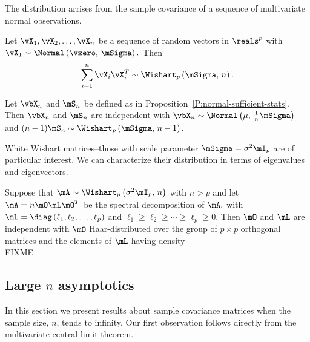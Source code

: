 \noindent
The distribution arrises from the sample covariance of a sequence of
multivariate normal observations.

\begin{proposition}
Let
\(
    \vX_1, \vX_2, \ldots, \vX_n
\)
be a sequence of \iid random vectors in 
\(
    \reals^p
\)
with
\(
    \vX_1
    \sim
    \Normal \left(
        \vzero, \,
        \mSigma
    \right).
\)
Then
\[
    \sum_{i=1}^n
        \vX_i \vX_i^T
    \sim
    \Wishart_p \left(
        \mSigma, \,
        n
    \right).
\]
\end{proposition}

\begin{proposition}
Let 
\(
    \vbX_n
\) 
and 
\(
    \mS_n
\)
be defined as in Proposition~\ref{P:normal-sufficient-stats}.  Then
\(
    \vbX_n
\)
and
\(
    \mS_n
\)
are independent with
\(
    \vbX_n
    \sim
    \Normal \left(
        \mu, \,
        \frac{1}{n}
        \mSigma
    \right)
\)
and
\(
    (n-1)
    \mS_n
    \sim
    \Wishart_p \left(
        \mSigma, \,
        n-1
    \right)
\).
\end{proposition}

\noindent
White Wishart matrices--those with scale parameter $\mSigma = \sigma^2 \mI_p$
are of particular interest.  We can characterize their distribution in
terms of eigenvalues and eigenvectors.

\begin{proposition}
Suppose that
\(
    \mA
    \sim
    \Wishart_p \left(
        \sigma^2 \mI_p, \,
        n
    \right)
\)
with
\(
    n > p
\)
and let
\(
    \mA = n \mO \mL \mO^T
\)
be the spectral decomposition of
\(
    \mA,
\)
with
\(
    \mL
    =
    \diag \left(
        \ell_1,
        \ell_2,
        \ldots,
        \ell_p
    \right)
\)
and
\(
    \ell_1
    \geq
    \ell_2
    \geq
    \cdots
    \geq
    \ell_p
    \geq
    0.
\)
Then $\mO$ and $\mL$ are independent with $\mO$ Haar-distributed over
the group of $p \times p$ orthogonal matrices and the elements of $\mL$
having density
\begin{equation}\label{E:wishart-eig-density}
\end{equation}    
    FIXME
\end{proposition}


\subsection{Large $n$ asymptotics}

In this section we present results about sample covariance matrices when the sample size, $n$, tends to infinity.  Our first observation follows directly from the multivariate central limit theorem.

